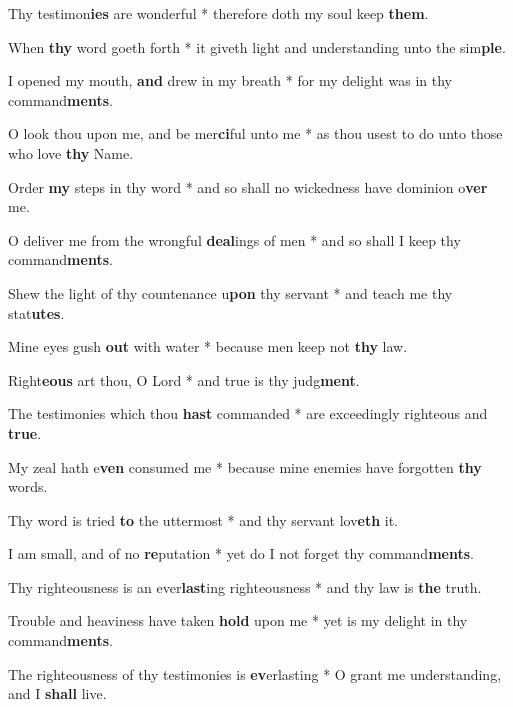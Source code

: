 \begin{multicols}{2}
	Thy testimon\textbf{ies} are wonderful * therefore doth my soul keep \textbf{them}.
	
	When \textbf{thy} word goeth forth * it giveth light and understanding unto the sim\textbf{ple}.
	
	I opened my mouth, \textbf{and} drew in my breath * for my delight was in thy command\textbf{ments}.
	
	O look thou upon me, and be mer\textbf{ci}ful unto me * as thou usest to do unto those who love \textbf{thy} Name.
	
	Order \textbf{my} steps in thy word * and so shall no wickedness have dominion o\textbf{ver} me.
	
	O deliver me from the wrongful \textbf{deal}ings of men * and so shall I keep thy command\textbf{ments}.
	
	Shew the light of thy countenance u\textbf{pon} thy servant * and teach me thy stat\textbf{utes}.
	
	Mine eyes gush \textbf{out} with water * because men keep not \textbf{thy} law.
	
	Right\textbf{eous} art thou, O Lord * and true is thy judg\textbf{ment}.
	
	The testimonies which thou \textbf{hast} commanded * are exceedingly righteous and \textbf{true}.
	
	My zeal hath e\textbf{ven} consumed me * because mine enemies have forgotten \textbf{thy} words.
	
	Thy word is tried \textbf{to} the uttermost * and thy servant lov\textbf{eth} it.
	
	I am small, and of no \textbf{re}putation * yet do I not forget thy command\textbf{ments}.
	
	Thy righteousness is an ever\textbf{last}ing righteousness * and thy law is \textbf{the} truth.
	
	Trouble and heaviness have taken \textbf{hold} upon me * yet is my delight in thy command\textbf{ments}.
	
	The righteousness of thy testimonies is \textbf{ev}erlasting * O grant me understanding, and I \textbf{shall} live.
\end{multicols}